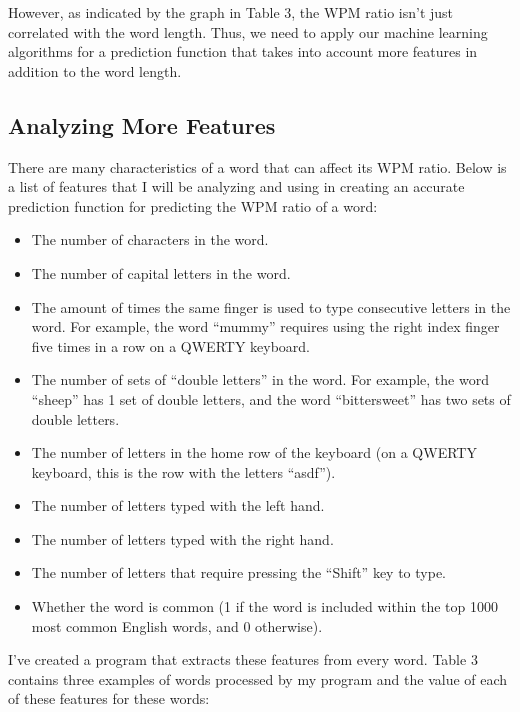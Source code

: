 \documentclass[12pt]{article}
\begin{document}
However, as indicated by the graph in Table 3, the WPM ratio isn't just correlated with the word length. Thus, we need to apply our machine learning algorithms for a prediction function that takes into account more features in addition to the word length.

\subsection*{Analyzing More Features}
There are many characteristics of a word that can affect its WPM ratio. Below is a list of features that I will be analyzing and using in creating an accurate prediction function for predicting the WPM ratio of a word:

\begin{itemize}
	\item The number of characters in the word.
	\item The number of capital letters in the word.
	\item The amount of times the same finger is used to type consecutive letters in the word. For example, the word ``mummy'' requires using the right index finger five times in a row on a QWERTY keyboard.
	\item The number of sets of ``double letters'' in the word. For example, the word ``sheep'' has 1 set of double letters, and the word ``bittersweet'' has two sets of double letters.
	\item The number of letters in the home row of the keyboard (on a QWERTY keyboard, this is the row with the letters ``asdf'').
	\item The number of letters typed with the left hand.
	\item The number of letters typed with the right hand.
	\item The number of letters that require pressing the ``Shift'' key to type.
	\item Whether the word is common (1 if the word is included within the top 1000 most common English words, and 0 otherwise).
\end{itemize}

I've created a program that extracts these features from every word. Table 3 contains three examples of words processed by my program and the value of each of these features for these words:
\end{document}
